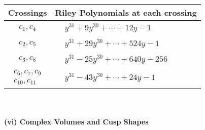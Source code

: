 \documentclass[1p]{elsarticle_modified}
\theoremstyle{definition}
\begin{document}
\begin{tabular}{m{50pt}|m{274pt}}
Crossings & \hspace{64pt}Riley Polynomials at each crossing \\
\hline $$\begin{aligned}c_{1},c_{4}\end{aligned}$$&$\begin{aligned}
&y^{31}+9 y^{30}+\cdots+12 y-1
\end{aligned}$\\
\hline $$\begin{aligned}c_{2},c_{5}\end{aligned}$$&$\begin{aligned}
&y^{31}+29 y^{30}+\cdots+524 y-1
\end{aligned}$\\
\hline $$\begin{aligned}c_{3},c_{8}\end{aligned}$$&$\begin{aligned}
&y^{31}-25 y^{30}+\cdots+640 y-256
\end{aligned}$\\
\hline $$\begin{aligned}c_{6},c_{7},c_{9}\\c_{10},c_{11}\end{aligned}$$&$\begin{aligned}
&y^{31}-43 y^{30}+\cdots+24 y-1
\end{aligned}$\\
\hline
\end{tabular}\\~\\
\newpage\flushleft \textbf{(vi) Complex Volumes and Cusp Shapes}
\end{document}
